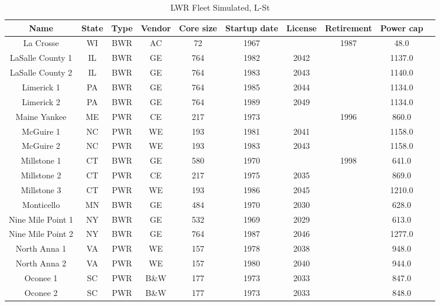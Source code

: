 \begin{table}
    \centering
    \caption{LWR Fleet Simulated, L-St}
    \label{tab:lwr_fleet2}
    \begin{tabular}{c c c c c c c c c c}
    \hline
    \textbf{Name} & \textbf{State} & \textbf{Type} & \textbf{Vendor} & \textbf{Core size} & \textbf{Startup date} & \textbf{License} & \textbf{Retirement} & \textbf{Power cap} \\
    \hline
    La Crosse           & WI & BWR & AC   & 72  & 1967 &      & 1987 & 48.0  \\
    LaSalle County 1    & IL & BWR & GE   & 764 & 1982 & 2042 &      & 1137.0\\
    LaSalle County 2    & IL & BWR & GE   & 764 & 1983 & 2043 &      & 1140.0\\
    Limerick 1          & PA & BWR & GE   & 764 & 1985 & 2044 &      & 1134.0\\
    Limerick 2          & PA & BWR & GE   & 764 & 1989 & 2049 &      & 1134.0\\
    Maine Yankee        & ME & PWR & CE   & 217 & 1973 &      & 1996 & 860.0 \\
    McGuire 1           & NC & PWR & WE   & 193 & 1981 & 2041 &      & 1158.0\\
    McGuire 2           & NC & PWR & WE   & 193 & 1983 & 2043 &      & 1158.0\\
    Millstone 1         & CT & BWR & GE   & 580 & 1970 &      & 1998 & 641.0 \\
    Millstone 2         & CT & PWR & CE   & 217 & 1975 & 2035 &      & 869.0 \\
    Millstone 3         & CT & PWR & WE   & 193 & 1986 & 2045 &      & 1210.0\\
    Monticello          & MN & BWR & GE   & 484 & 1970 & 2030 &      & 628.0 \\
    Nine Mile Point 1   & NY & BWR & GE   & 532 & 1969 & 2029 &      & 613.0 \\
    Nine Mile Point 2   & NY & BWR & GE   & 764 & 1987 & 2046 &      & 1277.0\\
    North Anna 1        & VA & PWR & WE   & 157 & 1978 & 2038 &      & 948.0 \\
    North Anna 2        & VA & PWR & WE   & 157 & 1980 & 2040 &      & 944.0 \\
    Oconee 1            & SC & PWR & B\&W & 177 & 1973 & 2033 &      & 847.0 \\
    Oconee 2            & SC & PWR & B\&W & 177 & 1973 & 2033 &      & 848.0 \\

\end{tabular}
\end{table}
